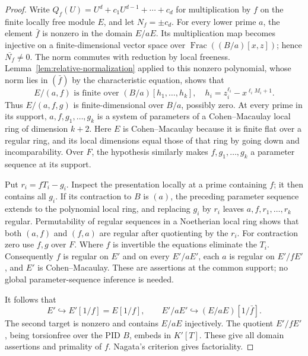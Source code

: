 \documentclass[11pt,reqno]{amsart}
\numberwithin{equation}{section}
\theoremstyle{plain}
\theoremstyle{definition}
\theoremstyle{remark}
\begin{document}
\begin{proof}
Write \(Q_f(U)=U^d+c_1U^{d-1}+\cdots+c_d\) for multiplication
by \(f\) on the finite locally free module \(E\), and let
\(N_f=\pm c_d\).  For every lower prime \(a\), the element
\(\bar f\) is nonzero in the domain \(E/aE\).  Its multiplication
map becomes injective on a finite-dimensional vector space over
\(\operatorname{Frac}((B/a)[x,z])\); hence
\(\overline{N_f}\ne0\).  The norm commutes with reduction by
local freeness.  Lemma~\ref{lem:relative-normalization} applied to
this nonzero polynomial, whose norm lies in \((\bar f)\) by the
characteristic equation, shows that
\[
 E/(a,f)\text{ is finite over }(B/a)[h_1,\ldots,h_k],
 \quad h_i=z_i^{\ell_i}-x^{\ell_iM_i+1}.
\]
Thus \(E/(a,f,g)\) is finite-dimensional over \(B/a\), possibly
zero.  At every prime in its support, \(a,f,g_1,\ldots,g_k\)
is a system of parameters of a Cohen--Macaulay local ring of
dimension \(k+2\).  Here \(E\) is Cohen--Macaulay because it
is finite flat over a regular ring, and its local dimensions equal
those of that ring by going down and incomparability.  Over \(F\),
the hypothesis similarly makes \(f,g_1,\ldots,g_k\) a parameter
sequence at its support.

Put \(r_i=fT_i-g_i\).  Inspect the presentation locally at a
prime containing \(f\); it then contains all \(g_i\).  If its
contraction to \(B\) is \((a)\), the preceding parameter sequence
extends to the polynomial local ring, and replacing \(g_i\) by
\(r_i\) leaves \(a,f,r_1,\ldots,r_k\) regular.  Permutability
of regular sequences in a Noetherian local ring shows that both
\((a,f)\) and \((f,a)\) are regular after quotienting by the
\(r_i\).  For contraction zero use \(f,g\) over \(F\).
Where \(f\) is invertible the equations eliminate the \(T_i\).
Consequently \(f\) is regular on \(E'\) and on every \(E'/aE'\),
each \(a\) is regular on \(E'/fE'\), and \(E'\) is
Cohen--Macaulay.  These are assertions at the common support;
no global parameter-sequence inference is needed.

It follows that
\[
 E'\hookrightarrow E'[1/f]=E[1/f],\qquad
 E'/aE'\hookrightarrow(E/aE)[1/\bar f].
\]
The second target is nonzero and contains \(E/aE\) injectively.
The quotient \(E'/fE'\), being torsionfree over the PID \(B\),
embeds in \(K'[T]\).  These give all domain assertions and
primality of \(f\).  Nagata's criterion gives factoriality.


\end{proof}
\end{document}
